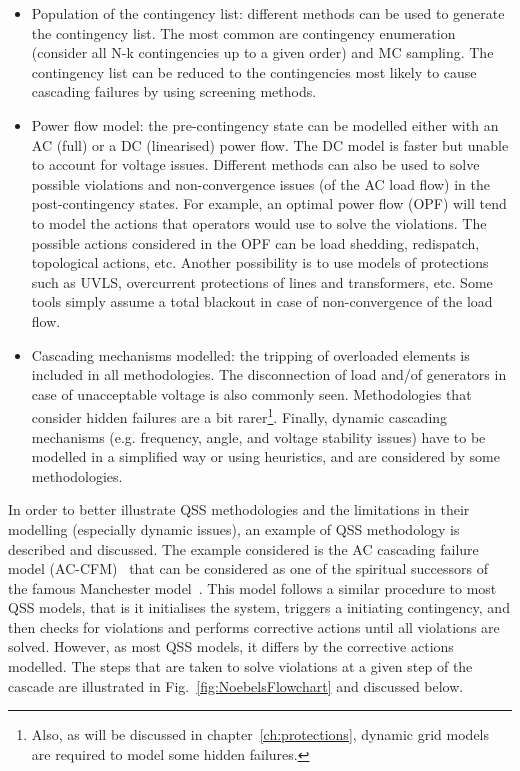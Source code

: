 \begin{itemize}
\begin{itemize}
    \end{itemize}
    \item Population of the contingency list: different methods can be used to generate the contingency list. The most common are contingency enumeration (consider all N-k contingencies up to a given order) and MC sampling. The contingency list can be reduced to the contingencies most likely to cause cascading failures by using screening methods.
    \item Power flow model: the pre-contingency state can be modelled either with an AC (full) or a DC (linearised) power flow. The DC model is faster but unable to account for voltage issues. Different methods can also be used to solve possible violations and non-convergence issues (of the AC load flow) in the post-contingency states. For example, an optimal power flow (OPF) will tend to model the actions that operators would use to solve the violations. The possible actions considered in the OPF can be load shedding, redispatch, topological actions, etc. Another possibility is to use models of protections such as UVLS, overcurrent protections of lines and transformers, etc. Some tools simply assume a total blackout in case of non-convergence of the load flow.
    \item Cascading mechanisms modelled: the tripping of overloaded elements is included in all methodologies. The disconnection of load and/of generators in case of unacceptable voltage is also commonly seen. Methodologies that consider hidden failures are a bit rarer\footnote{Also, as will be discussed in chapter~\ref{ch:protections}, dynamic grid models are required to model some hidden failures.}. Finally, dynamic cascading mechanisms (e.g. frequency, angle, and voltage stability issues) have to be modelled in a simplified way or using heuristics, and are considered by some methodologies.
\end{itemize}

In order to better illustrate QSS methodologies and the limitations in their modelling (especially dynamic issues), an example of QSS methodology is described and discussed. The example considered is the AC cascading failure model (AC-CFM)~\cite{ManchesterNoebels} that can be considered as one of the spiritual successors of the famous Manchester model~\cite{OriginalManchesterModel}. This model follows a similar procedure to most QSS models, that is it initialises the system, triggers a initiating contingency, and then checks for violations and performs corrective actions until all violations are solved. However, as most QSS models, it differs by the corrective actions modelled. The steps that are taken to solve violations at a given step of the cascade are illustrated in Fig.~\ref{fig:NoebelsFlowchart} and discussed below.

